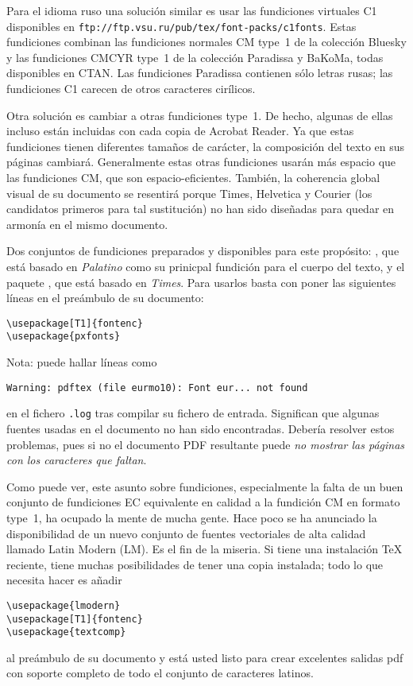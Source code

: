 Para el idioma ruso una solución similar es usar las fundiciones
virtuales C1 disponibles en
\texttt{ftp://ftp.vsu.ru/pub/tex/font-packs/c1fonts}.  Estas
fundiciones combinan las fundiciones normales CM type~1 de la
colección Bluesky y las fundiciones CMCYR type~1 de la colección Paradissa y
BaKoMa, todas disponibles en CTAN.  Las fundiciones Paradissa 
contienen sólo letras rusas; las fundiciones C1 carecen de otros
caracteres cirílicos.

Otra solución es cambiar a otras fundiciones \PSi{} type~1.
De hecho, algunas de ellas incluso están incluidas con cada copia de Acrobat
Reader.  Ya que estas fundiciones tienen diferentes tamaños de
carácter, la composición del texto en sus páginas cambiará.
Generalmente estas otras fundiciones usarán más espacio que las
fundiciones CM, que son espacio-eficientes.  También, la coherencia
global visual de su documento se resentirá porque  Times, Helvetica y
Courier (los candidatos primeros para tal sustitución) no han sido
diseñadas para quedar en armonía en el mismo documento.

Dos conjuntos de fundiciones preparados y disponibles para este propósito:
, que está basado en \emph{Palatino} como su prinicpal
fundición para el cuerpo del texto, y el paquete , que
está basado en \emph{Times}.  Para usarlos basta con poner las
siguientes líneas en el preámbulo de su documento:
\begin{code}
\begin{verbatim}
\usepackage[T1]{fontenc}
\usepackage{pxfonts}
\end{verbatim}
\end{code}

Nota: puede hallar líneas como
\begin{verbatim}
Warning: pdftex (file eurmo10): Font eur... not found
\end{verbatim}
en el fichero \texttt{.log} tras compilar su fichero de entrada.
Significan que algunas fuentes usadas en el documento no han sido
encontradas.  Debería resolver estos problemas, pues si no el
documento PDF resultante puede
\emph{no mostrar las páginas con los caracteres que faltan}.

Como puede ver, este asunto sobre fundiciones, especialmente la falta
de un buen conjunto de fundiciones EC equivalente en calidad a la
fundición CM en formato type~1, ha ocupado la mente de mucha gente.
Hace poco se ha anunciado la disponibilidad de un nuevo conjunto de
fuentes vectoriales de alta calidad llamado Latin Modern (LM).  Es el
fin de la miseria.  Si tiene una instalación  \TeX{} reciente, tiene
muchas posibilidades de tener una copia instalada; todo lo que
necesita hacer es añadir
\begin{code}
\begin{verbatim}  
\usepackage{lmodern}
\usepackage[T1]{fontenc} 
\usepackage{textcomp}
\end{verbatim}
\end{code}
al preámbulo de su documento y está usted listo para crear excelentes
salidas pdf con soporte completo de todo el conjunto de caracteres
latinos.

